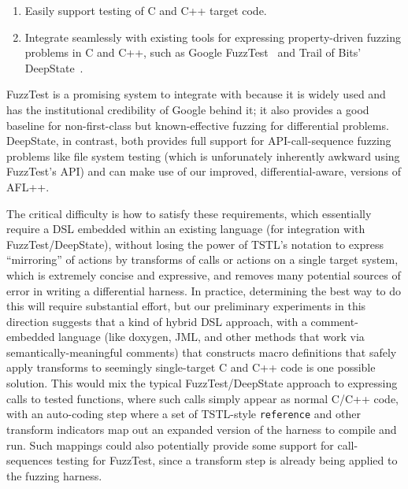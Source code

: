 \begin{enumerate}
\item Easily support testing of C and C++ target code.
  \item Integrate seamlessly with existing tools for expressing
    property-driven fuzzing problems in C and C++, such as Google
    FuzzTest~\cite{FuzzTest} and Trail of Bits'
    DeepState~\cite{DeepState,deepstaterepo}.
  \end{enumerate}

FuzzTest is a promising system to integrate with because it is widely
used and has the institutional credibility of Google behind it; it
also provides a good baseline for non-first-class but known-effective
fuzzing for differential problems.  DeepState, in contrast, both
provides full support for API-call-sequence fuzzing problems like
file system testing (which is unforunately inherently awkward using
FuzzTest's API) and can make use of our improved, differential-aware,
versions of AFL++.

The critical difficulty is how to satisfy these requirements, which
essentially require a DSL embedded within an existing language (for
integration with FuzzTest/DeepState), without losing the power of TSTL's notation to express ``mirroring''
of actions by transforms of calls or actions on a single target
system, which is extremely concise and expressive, and removes many potential sources
of error in writing a differential harness.  In practice, determining
the best way to do this will require substantial effort, but our
preliminary experiments in this direction suggests that a kind of
hybrid DSL approach, with a comment-embedded language (like doxygen, JML,
and other methods that work via semantically-meaningful comments) that
constructs macro definitions that safely apply transforms to seemingly
single-target C and C++ code is one possible solution.  This would mix
the typical FuzzTest/DeepState approach to expressing calls to tested
functions, where such calls simply appear as normal C/C++ code, with
an auto-coding step where a set of TSTL-style {\tt reference} and
other transform indicators map out an expanded version of the harness
to compile and run.  Such mappings could also potentially provide some
support for call-sequences testing for FuzzTest, since a transform
step is already being applied to the fuzzing harness.

